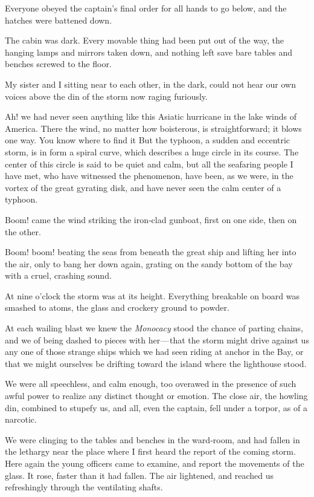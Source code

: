 \documentclass[12pt]{book}
\begin{document}
Everyone obeyed the captain’s final order for all hands to go below, and the
hatches were battened down.

The cabin was dark. Every movable thing had been put out of the way, the
hanging lamps and mirrors taken down, and nothing left save bare tables and
benches screwed to the floor.

My sister and I sitting near to each other, in the dark, could not hear our own
voices above the din of the storm now raging furiously.

Ah! we had never seen anything like this Asiatic hurricane in the lake winds
of America. There the wind, no matter how boisterous, is straightforward; it blows
one way. You know where to find it But the typhoon, a sudden and eccentric
storm, is in form a spiral curve, which describes a huge circle in its course. The
center of this circle is said to be quiet and calm, but all the seafaring people I have
met, who have witnessed the phenomenon, have been, as we were, in the vortex
of the great gyrating disk, and have never seen the calm center of a typhoon.

Boom! came the wind striking the iron‐clad gunboat, first on one side, then
on the other.

Boom! boom! beating the seas from beneath the great ship and lifting her
into the air, only to bang her down again, grating on the sandy bottom of the bay
with a cruel, crashing sound.

At nine o’clock the storm was at its height. Everything breakable on board
was smashed to atoms, the glass and crockery ground to powder.

At each wailing blast we knew the {\it Monocacy} stood the chance of parting
chains, and we of being dashed to pieces with her — that the storm might drive
against us any one of those strange ships which we had seen riding at anchor
in the Bay, or that we might ourselves be drifting toward the island where the
lighthouse stood.

We were all speechless, and calm enough, too overawed in the presence of
such awful power to realize any distinct thought or emotion. The close air, the
howling din, combined to stupefy us, and all, even the captain, fell under a torpor,
as of a narcotic.

We were clinging to the tables and benches in the ward‐room, and had fallen
in the lethargy near the place where I first heard the report of the coming storm.
Here again the young officers came to examine, and report the movements of
the glass. It rose, faster than it had fallen. The air lightened, and reached us
refreshingly through the ventilating shafts.
\end{document}
